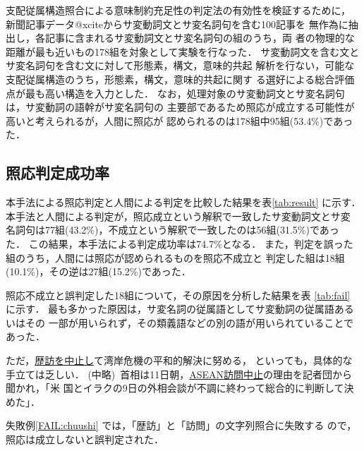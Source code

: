 支配従属構造照合による意味制約充足性の判定法の有効性を検証するために，
新聞記事データ@xciteからサ変動詞文とサ変名詞句を含む100記事を
無作為に抽出し，各記事に含まれるサ変動詞文とサ変名詞句の組のうち，両
者の物理的な距離が最も近いもの178組を対象として実験を行なった．
サ変動詞文を含む文とサ変名詞句を含む文に対して形態素，構文，意味的共起
解析を行ない，可能な支配従属構造のうち，形態素，構文，意味的共起に関す
る選好による総合評価点が最も高い構造を入力とした．
なお，処理対象のサ変動詞文とサ変名詞句は，サ変動詞の語幹がサ変名詞句の
主要部であるため照応が成立する可能性が高いと考えられるが，人間に照応が
認められるのは178組中95組(53.4\%)であった．

\subsection{照応判定成功率}

本手法による照応判定と人間による判定を比較した結果を表\ref{tab:result}
に示す．
本手法と人間による判定が，照応成立という解釈で一致したサ変動詞文とサ変
名詞句は77組(43.2\%)，不成立という解釈で一致したのは56組(31.5\%)であっ
た． 
この結果，本手法による判定成功率は74.7\%となる．
また，判定を誤った組のうち，人間には照応が認められるものを照応不成立と
判定した組は18組(10.1\%)，その逆は27組(15.2\%)であった．



照応不成立と誤判定した18組について，その原因を分析した結果を表
\ref{tab:fail} に示す．
最も多かった原因は，サ変名詞の従属語としてサ変動詞の従属語あるいはその
一部が用いられず，その類義語などの別の語が用いられていることであった．
\begin{FAIL}
\fail  ただ，\underline{歴訪を中止し}て湾岸危機の平和的解決に努める，
といっても，具体的な手立ては乏しい．
(中略)\ 
首相は11日朝，\underline{ASEAN訪問中止}の理由を記者団から聞かれ，「米
国とイラクの9日の外相会談が不調に終わって総合的に判断して決めた」．
\label{FAIL:chuushi}
\end{FAIL}
失敗例\ref{FAIL:chuushi} では，「歴訪」と「訪問」の文字列照合に失敗する
ので，照応は成立しないと誤判定された．

